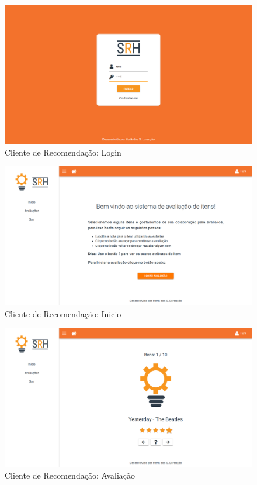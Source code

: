 \begin{figure}[H]
	\centering
	\includegraphics[width=.9\linewidth]{imagens/clientLogin.png}
	\caption[Cliente de Recomendação: Login]{Cliente de Recomendação: Login}
    \label{fig:clienteLogin}
\end{figure}

\begin{figure}[H]
	\centering
	\includegraphics[width=.9\linewidth]{imagens/clientInicio.png}
	\caption[Cliente de Recomendação: Inicio]{Cliente de Recomendação: Inicio}
    \label{fig:clienteInicio}
\end{figure}

\begin{figure}[H]
	\centering
	\includegraphics[width=.9\linewidth]{imagens/clientAvaliacao.png}
	\caption[Cliente de Recomendação: Avaliação]{Cliente de Recomendação: Avaliação}
    \label{fig:clienteAvaliacao}
\end{figure}

